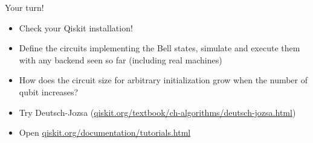 \begin{frame}{Your turn!}
\begin{itemize}
    \item<1-> Check your Qiskit installation!
    \item<2-> Define the circuits implementing the Bell states, simulate and execute them with any backend seen so far (including real machines)
    \item<3-> How does the circuit size for arbitrary initialization grow when the number of qubit increases?
    \item<4-> Try Deutsch-Jozsa (\url{qiskit.org/textbook/ch-algorithms/deutsch-jozsa.html})
    \item<5-> Open \url{qiskit.org/documentation/tutorials.html}
\end{itemize}
\end{frame}